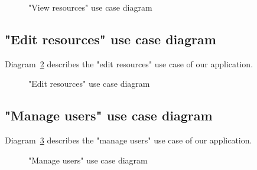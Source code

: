 \begin{figure}[h]
	\centerfloat

	\caption{"View resources" use case diagram}
	\label{fig:view-use-case-diagram}
\end{figure}

\subsection{"Edit resources" use case diagram}
Diagram~\ref{fig:edit-use-case-diagram} describes the "edit resources" use case of our application.

\begin{figure}[h]
	\centerfloat

	\caption{"Edit resources" use case diagram}
	\label{fig:edit-use-case-diagram}
\end{figure}

\subsection{"Manage users" use case diagram}
Diagram~\ref{fig:manage-use-case-diagram} describes the "manage users" use case of our application.

\begin{figure}[h]
	\centerfloat

	\caption{"Manage users" use case diagram}
	\label{fig:manage-use-case-diagram}
\end{figure}

